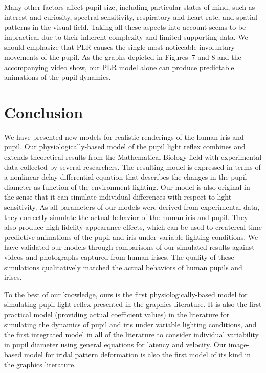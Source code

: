 \documentclass{acmtog} %
\begin{document}
Many other factors affect pupil size, including particular states of
mind, such as interest and curiosity, spectral sensitivity, respiratory
and heart rate, and spatial patterns in the visual field. Taking all
these aspects into account seems to be impractical due to their inherent
complexity and limited supporting data. We should emphasize that PLR
causes the single most noticeable involuntary movements of the pupil. As
the graphs depicted in Figures~7 and 8 and the accompanying video show,
our PLR model alone can produce predictable animations of the pupil
dynamics.

\section{Conclusion}
\label{sec:conclusion}
%
We have presented new models for realistic renderings of the human iris
and pupil. Our physiologically-based model of the pupil light reflex
combines and extends theoretical results from the Mathematical Biology
field with experimental data collected by several researchers. The
resulting model is expressed in terms of a nonlinear delay-differential
equation that describes the changes in the pupil diameter as function of
the environment lighting. Our model is also original in the sense that
it can simulate individual differences with respect to light
sensitivity. As all parameters of our models were derived from
experimental data, they correctly simulate the actual behavior of the
human iris and pupil. They also produce high-fidelity appearance
effects, which can be used to create\break real-time predictive
animations of the pupil and iris under variable lighting conditions. We
have validated our models through comparisons of our simulated results
against videos and photographs captured from human irises. The quality
of these simulations qualitatively matched the actual behaviors of human
pupils and irises.

To the best of our knowledge, ours is the first physiologically-based
model for simulating pupil light reflex presented in the graphics
literature. It is also the first practical model (providing actual
coefficient values) in the literature for simulating the dynamics of
pupil and iris under variable lighting conditions, and the first
integrated model in all of the literature to consider individual
variability in pupil diameter using general equations for latency and
velocity. Our image-based model for iridal pattern deformation is also
the first model of its kind in the graphics literature.\vskip21pt
\end{document}

